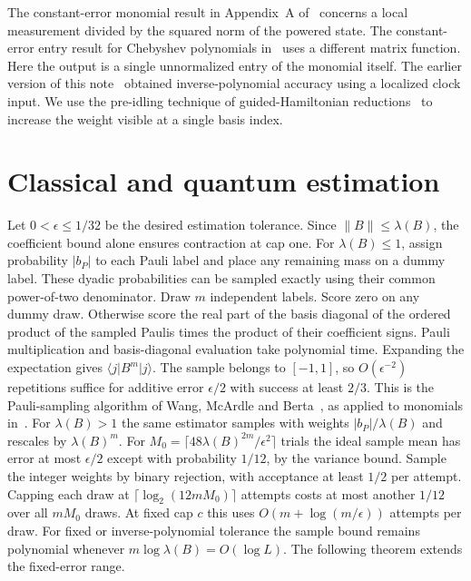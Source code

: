 \documentclass[11pt]{article}
\newcommand{\ket}[1]{\lvert #1\rangle}
\newcommand{\bra}[1]{\langle #1\rvert}
\newcommand{\norm}[1]{\lVert #1\rVert}
\begin{document}
The constant-error monomial result in Appendix~A of~\cite{cif} concerns a local measurement divided by the squared norm of the powered state. The constant-error entry result for Chebyshev polynomials in~\cite{cif} uses a different matrix function. Here the output is a single unnormalized entry of the monomial itself. The earlier version of this note~\cite{vone} obtained inverse-polynomial accuracy using a localized clock input. We use the pre-idling technique of guided-Hamiltonian reductions~\cite{glg,cade} to increase the weight visible at a single basis index.

\section{Classical and quantum estimation}
Let \(0<\epsilon\le1/32\) be the desired estimation tolerance. Since \(\norm B\le\lambda(B)\), the coefficient bound alone ensures contraction at cap one. For \(\lambda(B)\le1\), assign probability \(|b_P|\) to each Pauli label and place any remaining mass on a dummy label. These dyadic probabilities can be sampled exactly using their common power-of-two denominator. Draw \(m\) independent labels. Score zero on any dummy draw. Otherwise score the real part of the basis diagonal of the ordered product of the sampled Paulis times the product of their coefficient signs. Pauli multiplication and basis-diagonal evaluation take polynomial time. Expanding the expectation gives \(\bra j B^m\ket j\). The sample belongs to \([-1,1]\), so \(O(\epsilon^{-2})\) repetitions suffice for additive error \(\epsilon/2\) with success at least \(2/3\). This is the Pauli-sampling algorithm of Wang, McArdle and Berta~\cite{wang}, as applied to monomials in~\cite{cif}. For \(\lambda(B)>1\) the same estimator samples with weights \(|b_P|/\lambda(B)\) and rescales by \(\lambda(B)^m\). For \(M_0=\lceil48\lambda(B)^{2m}/\epsilon^2\rceil\) trials the ideal sample mean has error at most \(\epsilon/2\) except with probability \(1/12\), by the variance bound. Sample the integer weights by binary rejection, with acceptance at least \(1/2\) per attempt. Capping each draw at \(\lceil\log_2(12mM_0)\rceil\) attempts costs at most another \(1/12\) over all \(mM_0\) draws. At fixed cap \(c\) this uses \(O(m+\log(m/\epsilon))\) attempts per draw. For fixed or inverse-polynomial tolerance the sample bound remains polynomial whenever \(m\log\lambda(B)=O(\log L)\). The following theorem extends the fixed-error range.
\end{document}
